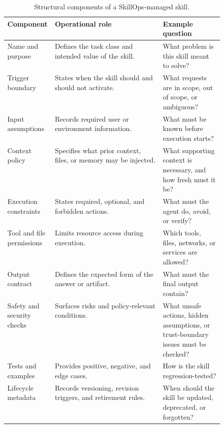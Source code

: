 \documentclass[11pt]{article}
\begin{document}
\begin{table}[t]
\centering
\footnotesize
\begin{tabularx}{\linewidth}{
    >{\raggedright\arraybackslash}p{0.22\linewidth}
    >{\raggedright\arraybackslash}X
    >{\raggedright\arraybackslash}p{0.29\linewidth}
}
\toprule
\textbf{Component} & \textbf{Operational role} & \textbf{Example question} \\
\midrule
Name and purpose & Defines the task class and intended value of the skill. &
What problem is this skill meant to solve? \\
Trigger boundary & States when the skill should and should not activate. &
What requests are in scope, out of scope, or ambiguous? \\
Input assumptions & Records required user or environment information. & What
must be known before execution starts? \\
Context policy & Specifies what prior context, files, or memory may be
injected. & What supporting context is necessary, and how fresh must it be? \\
Execution constraints & States required, optional, and forbidden actions. &
What must the agent do, avoid, or verify? \\
Tool and file permissions & Limits resource access during execution. & Which
tools, files, networks, or services are allowed? \\
Output contract & Defines the expected form of the answer or artifact. & What
must the final output contain? \\
Safety and security checks & Surfaces risks and policy-relevant conditions. &
What unsafe actions, hidden assumptions, or trust-boundary issues must be
checked? \\
Tests and examples & Provides positive, negative, and edge cases. & How is the
skill regression-tested? \\
Lifecycle metadata & Records versioning, revision triggers, and retirement
rules. & When should the skill be updated, deprecated, or forgotten? \\
\bottomrule
\end{tabularx}
\caption{Structural components of a SkillOps-managed skill.}
\label{tab:skill-components}
\end{table}
\end{document}
